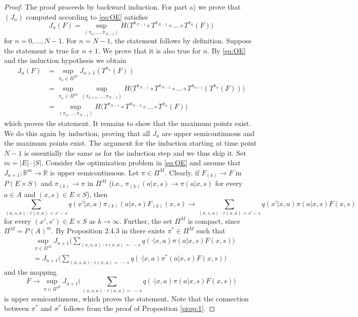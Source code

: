 \documentclass[reqno, 12pt]{amsart}%
\newcommand{\R}{\mathbb{R}} %
\theoremstyle{definition}
\numberwithin{equation}{section} \numberwithin{theorem}{section}
\begin{document}
\begin{proof} The proof proceeds by backward induction. For part a) we prove that $(J_n)$  computed according to \eqref{eq:OE} satisfies
$$ J_n(F)= \sup_{(\pi_n,\ldots,\pi_{N-1})} H\big(T^{\pi_{N-1}}\circ T^{\pi_{N-2}} \circ \ldots \circ T^{\pi_n}(F)\big)$$
for $n=0,\ldots,N-1.$ For $n=N-1$, the statement follows by definition. Suppose the statement is true for $n+1.$ We prove that it is also true for $n$. By \eqref{eq:OE} and the induction hypothesis we obtain
\begin{align*}
    J_n(F) & =  \sup_{\pi_n\in \Pi^M} J_{n+1}(T^{\pi_n}(F)) \\
    & =  \sup_{\pi_n\in \Pi^M}  \sup_{(\pi_{n+1},\ldots,\pi_{N-1})} H\big(T^{\pi_{N-1}}\circ T^{\pi_{N-2}} \circ \ldots \circ T^{\pi_{n+1}}(T^{\pi_n}(F))\big) \\
    &= \sup_{(\pi_n,\ldots,\pi_{N-1})} H\big(T^{\pi_{N-1}}\circ T^{\pi_{N-2}} \circ \ldots \circ T^{\pi_n}(F)\big)
\end{align*}
which proves the statement. It remains to show that the maximum points exist. We do this again by induction, proving that all $J_n$ are upper semicontinuous and the maximum points exist. The argument for the induction starting at time point $N-1$ is essentially the same as for the induction step and we thus skip it. 
Set $m=|E|\cdot|S|.$
Consider the optimization problem in \eqref{eq:OE} and assume that $J_{n+1}: \R^{m}\to \R$ is upper semicontinuous. Let $\pi\in \Pi^M$.    %
Clearly, if 
$F_{(k)}\to F$ in $P(E\times S)$ and 
$\pi_{(k)}\to \pi$ in $\Pi^M$ (i.e.,
$\pi_{(k)}(a|x,s)\to \pi(a|x,s)$ for every $a\in A$ and  $(x,s)\in E\times S$), then
    $$   \sum_{(x,s,a) \, : \, r(x,a)=s'-s}  q(x'|x,a)\pi_{(k)}(a|x,s) 
    F_{(k)}(x,s)\to \sum_{(x,s,a) \, : \, r(x,a)=s'-s}  q(x'|x,a)\pi(a|x,s) 
    F(x,s)$$
for every $(x',s')\in E\times S$ as $k\to\infty.$  
    Further, the set $\Pi^M$ is compact, since $\Pi^M=P(A)^m.$ 
    By Proposition 2.4.3 in \cite{br11} 
    there exists  $\pi^*\in\Pi^M$ such that
    \begin{align*}
        &  \sup_{\pi\in \Pi^M} J_{n+1} \Big(\sum_{(x,s,a) \, : \, r(x,a)=\cdot-s}  q(\cdot|x,a)\pi(a|x,s) F(x,s)\Big)\\
        & = J_{n+1} \Big(\sum_{(x,s,a) \, : \, r(x,a)=\cdot-s}  q(\cdot|x,a)\pi^*(a|x,s) F(x,s)\Big)
    \end{align*}
    and the mapping 
     $$  F \to  \sup_{\pi\in \Pi^M} J_{n+1} \Big(\sum_{(x,s,a) \, : \, r(x,a)=\cdot-s}  q(\cdot|x,a)\pi(a|x,s) F(x,s)\Big)$$
     is upper semicontinuous, which proves the statement. Note that the connection between $\pi^*$ and $\sigma^*$ follows from the proof of Proposition \ref{prop:1}.
\end{proof}
\end{document}
